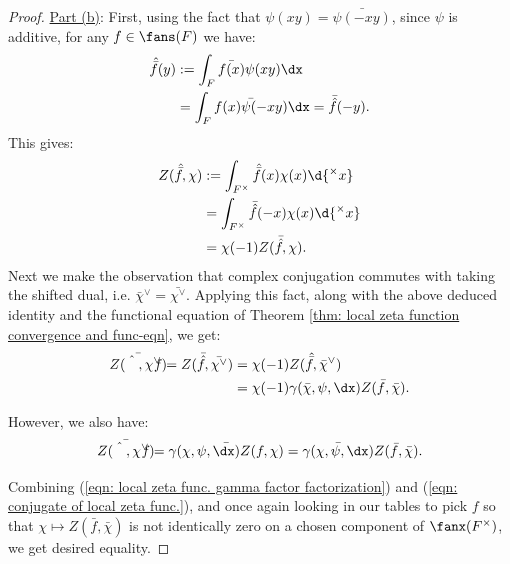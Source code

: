 \documentclass[11pt, x11names, openany]{book}
\begin{document}
\begin{proof}
    \underline{Part (b)}:  First, using the fact that $\psi(xy) = \bar{\psi(-xy)}$, since $\psi$ is additive, for any $f \in \fans(F)$ we have:
    \begin{align*}
        \hat{\bar{f}}(y) &:= \int_{F} \bar{f(x)} \psi(xy) \dx\\
        &= \int_{F} \bar{f(x)\psi(-xy)} \dx = \bar{\hat{f}}(-y).
    \end{align*}
    This gives:
    \begin{align*}
        Z(\hat{\bar{f}}, \chi) &:= \int_{F^\times} \hat{\bar{f}}(x) \chi(x)\d{^\times x}\\
        &= \int_{F^\times} \bar{\hat{f}}(-x)\chi(x) \d{^\times x}\\
        &= \chi(-1) Z(\bar{\hat{f}}, \chi).
    \end{align*}
    Next we make the observation that complex conjugation commutes with taking the shifted dual, i.e. $\bar{\chi}^\lor = \bar{\chi^\lor}$. Applying this fact, along with the above deduced identity and the functional equation of Theorem \ref{thm: local zeta function convergence and func-eqn}, we get:
    \begin{align}
        \label{eqn: local zeta func. gamma factor factorization}
        \bar{Z(\hat{f}, \chi^\lor)} = Z(\bar{\hat{f}}, \bar{\chi^\lor}) &= \chi(-1)Z(\hat{\bar{f}}, \bar{\chi}^\lor) \nonumber \\
        &= \chi(-1) \gamma(\bar{\chi}, \psi, \dx) Z(\bar{f}, \bar{\chi}).
    \end{align}
    
    However, we also have:
    \begin{equation}
        \label{eqn: conjugate of local zeta func.}
        \bar{Z(\hat{f}, \chi^\lor)} = \bar{\gamma(\chi, \psi, \dx) Z(f, \chi)} = \bar{\gamma(\chi, \psi, \dx)} Z(\bar{f}, \bar{\chi}).
    \end{equation}
    
    Combining (\ref{eqn: local zeta func. gamma factor factorization}) and (\ref{eqn: conjugate of local zeta func.}), and once again looking in our tables to pick $f$ so that $\chi \mapsto Z(\bar{f}, \bar{\chi})$ is not identically zero on a chosen component of $\fanx(F^\times)$, we get desired equality.
    \end{proof}
    
\end{document}
